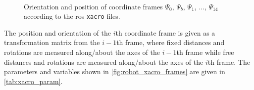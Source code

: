 \begin{figure}[htbp]
\vspace*{-10mm}
\hspace{-10mm}
%
\vspace{5mm}\\
\hspace*{-15mm}
%
\caption{Orientation and position of coordinate frames $\Psi_0$, $\Psi_b$, $\Psi_1$, ..., $\Psi_{14}$ according to the \gls{ros} \texttt{xacro} files.}
\label{fig:robot_xacro_frames}
\end{figure}

The position and orientation of the $i$th coordinate frame is given as a transformation matrix from the $i-1$th frame, where fixed distances and rotations are measured along/about the axes of the $i-1$th frame while free distances and rotations are measured along/about the axes of the $i$th frame. The parameters and variables shown in \autoref{fig:robot_xacro_frames} are given in \autoref{tab:xacro_param}.

